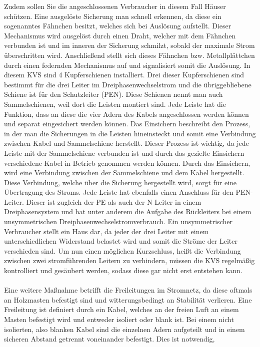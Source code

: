 Zudem sollen Sie die angeschlossenen Verbraucher in diesem Fall Häuser schützen. Eine ausgelöste Sicherung man schnell erkennen, da diese ein sogenanntes 
Fähnchen besitzt, welches sich bei Auslösung aufstellt. 
Dieser Mechanismus wird ausgelöst durch einen Draht, welcher mit dem Fähnchen verbunden ist und im inneren der Sicherung schmilzt, sobald der maximale Strom 
überschritten wird. Anschließend stellt sich dieses Fähnchen bzw. Metallplättchen durch einen federnden Mechanismus auf und signalisiert somit die Auslösung. 
In diesem KVS sind 4 Kupferschienen installiert. Drei dieser Kupferschienen sind bestimmt für die drei Leiter im Dreiphasenwechselstrom und die übriggebliebene 
Schiene ist für den Schutzleiter (PEN). Diese Schienen nennt man auch Sammelschienen, weil dort die Leisten montiert sind. Jede Leiste hat die Funktion,
dass an diese die vier Adern des Kabels angeschlossen werden können und separat eingesichert werden können. Das Einsichern beschreibt den Prozess, in der 
man die Sicherungen in die Leisten hineinsteckt und somit eine Verbindung zwischen Kabel und Sammelschiene herstellt. Dieser Prozess ist wichtig, da 
jede Leiste mit der Sammelschiene verbunden ist und durch das gezielte Einsichern verschiedene Kabel in Betrieb genommen werden können. Durch das Einsichern,
wird eine Verbindung zwischen der Sammelschiene und dem Kabel hergestellt. Diese Verbindung, welche über die Sicherung hergestellt wird, sorgt für eine 
Übertragung des Stroms. Jede Leiste hat ebenfalls einen Anschluss für den PEN-Leiter. Dieser ist zugleich der PE als auch der N Leiter in einem 
Dreiphasensystem und hat unter anderem die Aufgabe des Rückleiters bei einem unsymmetrischen Dreiphasenwechselstromverbrauch. Ein unsymmetrischer 
Verbraucher stellt \zB ein Haus dar, da jeder der drei Leiter mit einem unterschiedlichen Widerstand belastet wird und somit die Ströme der Leiter verschieden 
sind. Um nun einen möglichen Kurzschluss, heißt die Verbindung zwischen zwei stromführenden Leitern zu verhindern, müssen die KVS regelmäßig kontrolliert und 
gesäubert werden, sodass diese gar nicht erst entstehen kann. \autocite{Weigerber.2013}
\\\\ 
Eine weitere Maßnahme betrifft die Freileitungen im Stromnetz, da diese oftmals an Holzmasten befestigt sind und witterungsbedingt an Stabilität verlieren. 
Eine Freileitung ist definiert durch ein Kabel, welches an der freien Luft an einem Masten befestigt wird und entweder isoliert oder blank ist. Bei einem 
nicht isolierten, also blanken Kabel sind die einzelnen Adern aufgeteilt und in einem sicheren Abstand getrennt voneinander befestigt. Dies ist notwendig, 
